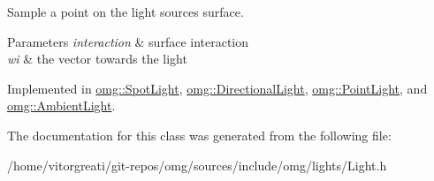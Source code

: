 Sample a point on the light source\textquotesingle{}s surface. 


\begin{DoxyParams}{Parameters}
{\em interaction} & surface interaction \\
\hline
{\em wi} & the vector towards the light \\
\hline
\end{DoxyParams}


Implemented in \mbox{\hyperlink{classomg_1_1_spot_light_abac464ecd5e2799577c3d01983b87ff6}{omg\+::\+Spot\+Light}}, \mbox{\hyperlink{classomg_1_1_directional_light_a565733b42c77973b765d7afea14461f5}{omg\+::\+Directional\+Light}}, \mbox{\hyperlink{classomg_1_1_point_light_aa77747811ae675d0f6140ca75ecbebda}{omg\+::\+Point\+Light}}, and \mbox{\hyperlink{classomg_1_1_ambient_light_a83502a1ccd9b77845d26906e6eea94e6}{omg\+::\+Ambient\+Light}}.



The documentation for this class was generated from the following file\+:\begin{DoxyCompactItemize}
\item 
/home/vitorgreati/git-\/repos/omg/sources/include/omg/lights/Light.\+h\end{DoxyCompactItemize}
